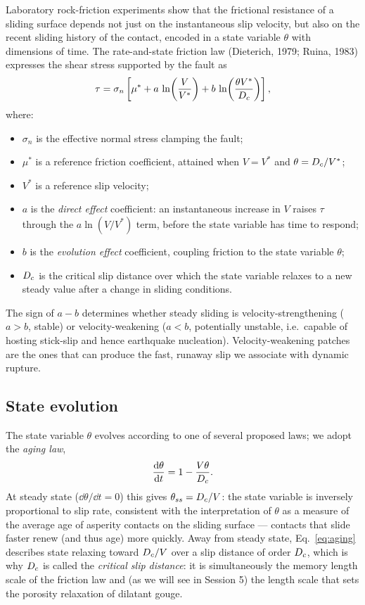 Laboratory rock-friction experiments show that the frictional resistance of a sliding surface depends not just on the instantaneous slip velocity, but also on the recent sliding history of the contact, encoded in a state variable $\theta$ with dimensions of time. The rate-and-state friction law (Dieterich, 1979; Ruina, 1983) expresses the shear stress supported by the fault as
\begin{equation}
\tau = \sigma_n\left[\mu^\ast + a\,\ln\!\left(\frac{V}{V^\ast}\right) + b\,\ln\!\left(\frac{\theta V^\ast}{D_c}\right)\right],
\label{eq:rsf}
\end{equation}
where:
\begin{itemize}
\item $\sigma_n$ is the effective normal stress clamping the fault;
\item $\mu^\ast$ is a reference friction coefficient, attained when $V = V^\ast$ and $\theta = D_c / V^\ast$;
\item $V^\ast$ is a reference slip velocity;
\item $a$ is the \emph{direct effect} coefficient: an instantaneous increase in $V$ raises $\tau$ through the $a\ln(V/V^\ast)$ term, before the state variable has time to respond;
\item $b$ is the \emph{evolution effect} coefficient, coupling friction to the state variable $\theta$;
\item $D_c$ is the critical slip distance over which the state variable relaxes to a new steady value after a change in sliding conditions.
\end{itemize}
The sign of $a - b$ determines whether steady sliding is velocity-strengthening ($a > b$, stable) or velocity-weakening ($a < b$, potentially unstable, i.e.\ capable of hosting stick-slip and hence earthquake nucleation). Velocity-weakening patches are the ones that can produce the fast, runaway slip we associate with dynamic rupture.

\subsection{State evolution}

The state variable $\theta$ evolves according to one of several proposed laws; we adopt the \emph{aging law},
\begin{equation}
\frac{\mathrm{d} \theta}{\mathrm{d} t} = 1 - \frac{V\theta}{D_c}.
\label{eq:aging}
\end{equation}
At steady state ($\dd\theta/\dd t = 0$) this gives $\theta_{ss} = D_c / V$: the state variable is inversely proportional to slip rate, consistent with the interpretation of $\theta$ as a measure of the average age of asperity contacts on the sliding surface --- contacts that slide faster renew (and thus age) more quickly. Away from steady state, Eq.~\eqref{eq:aging} describes state relaxing toward $D_c/V$ over a slip distance of order $D_c$, which is why $D_c$ is called the \emph{critical slip distance}: it is simultaneously the memory length scale of the friction law and (as we will see in Session 5) the length scale that sets the porosity relaxation of dilatant gouge.

